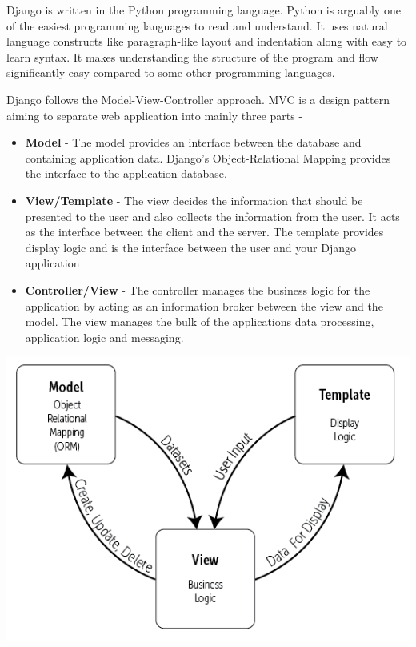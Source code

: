 \documentclass[../thesis.tex]{subfiles}
\begin{document}
Django is written in the Python programming language. Python is arguably one of the easiest programming languages to read and understand. It uses natural language constructs like paragraph-like layout and indentation along with easy to learn syntax. It makes understanding the structure of the program and flow significantly easy compared to some other programming languages.

Django follows the Model-View-Controller approach. MVC is a design pattern aiming to separate web application into mainly three parts -
\newline
    
\begin{itemize}
	\item \textbf{Model} - The model provides an interface between the database and containing application data. Django’s Object-Relational Mapping provides the interface to the application database.
	\newline
    
	\item \textbf{View/Template} - The view decides the information that should be presented to the user and also collects the information from the user. It acts as the interface between the client and the server. The template provides display logic and is the interface between the user and your Django application
	\newline
    
	\item \textbf{Controller/View} - The controller manages the business logic for the application by acting as an information broker between the view and the model. The view manages the bulk of the applications data processing, application logic and messaging.
	\newline
    
\end{itemize}
\begin{center}
	\includegraphics[scale=0.63]{../images/Django.png}
\end{center}
\end{document}
